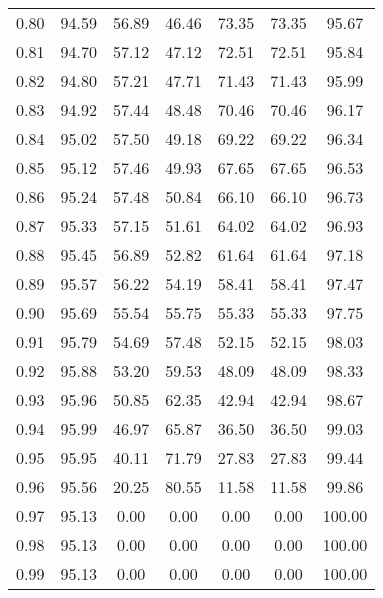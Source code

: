 \begin{tabular}{|c|c|c|c|c|c|c|}
      0.80 &     94.59 &     56.89 &      46.46 &   73.35 &      73.35 &         95.67 \\
      0.81 &     94.70 &     57.12 &      47.12 &   72.51 &      72.51 &         95.84 \\
      0.82 &     94.80 &     57.21 &      47.71 &   71.43 &      71.43 &         95.99 \\
      0.83 &     94.92 &     57.44 &      48.48 &   70.46 &      70.46 &         96.17 \\
      0.84 &     95.02 &     57.50 &      49.18 &   69.22 &      69.22 &         96.34 \\
      0.85 &     95.12 &     57.46 &      49.93 &   67.65 &      67.65 &         96.53 \\
      0.86 &     95.24 &     57.48 &      50.84 &   66.10 &      66.10 &         96.73 \\
      0.87 &     95.33 &     57.15 &      51.61 &   64.02 &      64.02 &         96.93 \\
      0.88 &     95.45 &     56.89 &      52.82 &   61.64 &      61.64 &         97.18 \\
      0.89 &     95.57 &     56.22 &      54.19 &   58.41 &      58.41 &         97.47 \\
      0.90 &     95.69 &     55.54 &      55.75 &   55.33 &      55.33 &         97.75 \\
      0.91 &     95.79 &     54.69 &      57.48 &   52.15 &      52.15 &         98.03 \\
      0.92 &     95.88 &     53.20 &      59.53 &   48.09 &      48.09 &         98.33 \\
      0.93 &     95.96 &     50.85 &      62.35 &   42.94 &      42.94 &         98.67 \\
      0.94 &     95.99 &     46.97 &      65.87 &   36.50 &      36.50 &         99.03 \\
      0.95 &     95.95 &     40.11 &      71.79 &   27.83 &      27.83 &         99.44 \\
      0.96 &     95.56 &     20.25 &      80.55 &   11.58 &      11.58 &         99.86 \\
      0.97 &     95.13 &      0.00 &       0.00 &    0.00 &       0.00 &        100.00 \\
      0.98 &     95.13 &      0.00 &       0.00 &    0.00 &       0.00 &        100.00 \\
      0.99 &     95.13 &      0.00 &       0.00 &    0.00 &       0.00 &        100.00 \\
\bottomrule
\end{tabular}
